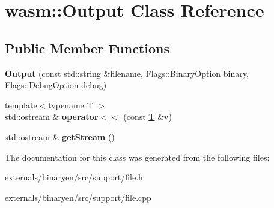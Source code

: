 \hypertarget{classwasm_1_1_output}{}\section{wasm\+:\+:Output Class Reference}
\label{classwasm_1_1_output}
\subsection*{Public Member Functions}
\begin{DoxyCompactItemize}
\item 
\mbox{\label{classwasm_1_1_output_ac700d5e7e5149390d863dd3fd2686549}} 
{\bfseries Output} (const std\+::string \&filename, Flags\+::\+Binary\+Option binary, Flags\+::\+Debug\+Option debug)
\item 
\mbox{\label{classwasm_1_1_output_af0c9841d4958f9d29e5a90253c99626c}} 
{\footnotesize template$<$typename T $>$ }\\std\+::ostream \& {\bfseries operator$<$$<$} (const \mbox{\hyperlink{struct_t}{T}} \&v)
\item 
\mbox{\label{classwasm_1_1_output_ae7945df539fcdf17043a136c75e6452b}} 
std\+::ostream \& {\bfseries get\+Stream} ()
\end{DoxyCompactItemize}


The documentation for this class was generated from the following files\+:\begin{DoxyCompactItemize}
\item 
externals/binaryen/src/support/file.\+h\item 
externals/binaryen/src/support/file.\+cpp\end{DoxyCompactItemize}
